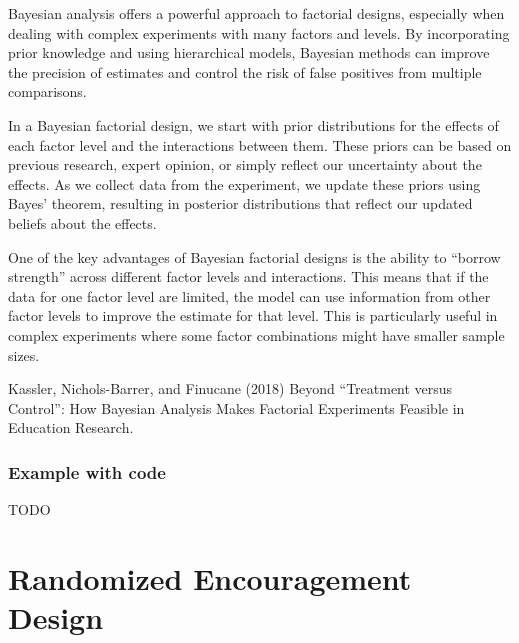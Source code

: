\documentclass[
  letterpaper,
  DIV=11,
  numbers=noendperiod]{scrreprt}
\begin{document}
Bayesian analysis offers a powerful approach to factorial designs,
especially when dealing with complex experiments with many factors and
levels. By incorporating prior knowledge and using hierarchical models,
Bayesian methods can improve the precision of estimates and control the
risk of false positives from multiple comparisons.

In a Bayesian factorial design, we start with prior distributions for
the effects of each factor level and the interactions between them.
These priors can be based on previous research, expert opinion, or
simply reflect our uncertainty about the effects. As we collect data
from the experiment, we update these priors using Bayes' theorem,
resulting in posterior distributions that reflect our updated beliefs
about the effects.

One of the key advantages of Bayesian factorial designs is the ability
to ``borrow strength'' across different factor levels and interactions.
This means that if the data for one factor level are limited, the model
can use information from other factor levels to improve the estimate for
that level. This is particularly useful in complex experiments where
some factor combinations might have smaller sample sizes.

\begin{tcolorbox}[enhanced jigsaw, colframe=quarto-callout-tip-color-frame, left=2mm, toprule=.15mm, colbacktitle=quarto-callout-tip-color!10!white, title=\textcolor{quarto-callout-tip-color}{\faLightbulb}\hspace{0.5em}{Learn more}, coltitle=black, rightrule=.15mm, leftrule=.75mm, colback=white, arc=.35mm, bottomtitle=1mm, bottomrule=.15mm, breakable, titlerule=0mm, opacitybacktitle=0.6, toptitle=1mm, opacityback=0]

Kassler, Nichols-Barrer, and Finucane (2018) Beyond ``Treatment versus
Control'': How Bayesian Analysis Makes Factorial Experiments Feasible in
Education Research.

\end{tcolorbox}

\subsection{Example with code}\label{example-with-code-3}

TODO

\chapter{Randomized Encouragement
Design}\label{randomized-encouragement-design}
\end{document}
